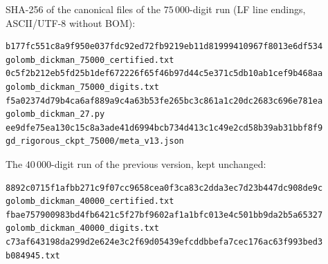 \documentclass[11pt,a4paper]{article}
\theoremstyle{remark}
\begin{document}
SHA-256 of the canonical files of the $75\,000$-digit run (LF line
endings, ASCII/UTF-8 without BOM):
\begin{lstlisting}
b177fc551c8a9f950e037fdc92ed72fb9219eb11d81999410967f8013e6df534  golomb_dickman_75000_certified.txt
0c5f2b212eb5fd25b1def672226f65f46b97d44c5e371c5db10ab1cef9b468aa  golomb_dickman_75000_digits.txt
f5a02374d79b4ca6af889a9c4a63b53fe265bc3c861a1c20dc2683c696e781ea  golomb_dickman_27.py
ee9dfe75ea130c15c8a3ade41d6994bcb734d413c1c49e2cd58b39ab31bbf8f9  gd_rigorous_ckpt_75000/meta_v13.json
\end{lstlisting}
The $40\,000$-digit run of the previous version, kept unchanged:
\begin{lstlisting}
8892c0715f1afbb271c9f07cc9658cea0f3ca83c2dda3ec7d23b447dc908de9c  golomb_dickman_40000_certified.txt
fbae757900983bd4fb6421c5f27bf9602af1a1bfc013e4c501bb9da2b5a65327  golomb_dickman_40000_digits.txt
c73af643198da299d2e624e3c2f69d05439efcddbbefa7cec176ac63f993bed3  b084945.txt
\end{lstlisting}
\end{document}
